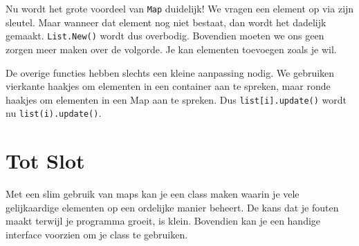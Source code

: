Nu wordt het grote voordeel van \texttt{Map} duidelijk! We vragen een element op via zijn sleutel. Maar wanneer dat element nog niet bestaat, dan wordt het dadelijk gemaakt. \texttt{List.New()} wordt dus overbodig. Bovendien moeten we ons geen zorgen meer maken over de volgorde. Je kan elementen toevoegen zoals je wil.

De overige functies hebben slechts een kleine aanpassing nodig. We gebruiken vierkante haakjes om elementen in een container aan te spreken, maar ronde haakjes om elementen in een Map aan te spreken. Dus \texttt{list[i].update()} wordt nu \texttt{list(i).update()}.

\section{Tot Slot}
Met een slim gebruik van maps kan je een class maken waarin je vele gelijkaardige elementen op een ordelijke manier beheert. De kans dat je fouten maakt terwijl je programma groeit, is klein. Bovendien kan je een handige interface voorzien om je class te gebruiken.


